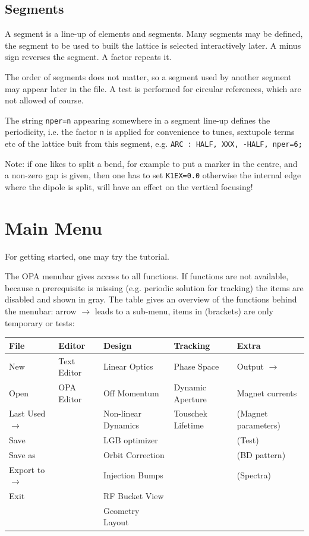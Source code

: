 \documentclass[12pt]{article}
\begin{document}
\subsection{\label{ssecsegm}Segments}
A segment is a line-up of elements and segments.
Many segments may be defined, the segment to be used to built the lattice is selected interactively later.
A minus sign reverses the segment. A factor repeats it.

The order of segments does not matter, so a segment used by another segment may appear later in the file.
A test is performed for circular references, which are not allowed of course.

The string {\tt nper=n} appearing somewhere in a segment line-up defines the periodicity,
i.e. the factor {\tt n} is applied for convenience to tunes, sextupole terms
etc of the lattice buit from this segment, e.g. {\tt ARC : HALF, XXX, -HALF, nper=6;}

Note: if one likes to split a bend, for example to put a marker in the centre,
and a non-zero gap is given, then one has to set {\tt K1EX=0.0} otherwise the
internal edge where the dipole is split, will have an effect on the vertical focusing!


\section{Main Menu}
For getting started, one may try the tutorial. 

The OPA menubar gives access to all functions. If functions are not available, because a prerequisite is
missing (e.g. periodic solution for tracking) the items are disabled and shown in gray.
The table gives an overview of the functions behind the menubar: arrow $\rightarrow$ leads to a sub-menu, items in (brackets) are only temporary or tests:

{\small \begin{tabular}{||l|l|l|l|l||}
\hline
File & Editor & Design & Tracking & Extra \\
\hline
New & Text Editor & Linear Optics & Phase Space & Output $\rightarrow$  \\
Open & OPA Editor & Off Momentum & Dynamic Aperture & Magnet currents \\
Last Used $\rightarrow$ & & Non-linear Dynamics & Touschek Lifetime &   (Magnet parameters)\\
Save & & LGB optimizer & &  (Test)\\
Save as & & Orbit Correction &  & (BD pattern)\\
Export to $\rightarrow$ & & Injection Bumps& &  (Spectra) \\
Exit & & RF Bucket View  & & \\
 & & Geometry Layout & & \\
\hline
\end{tabular}}\vspace{1ex}
\end{document}
